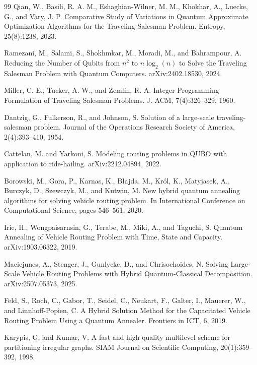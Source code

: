 \begin{thebibliography}{99}
Qian, W., Basili, R. A. M., Eshaghian-Wilner, M. M., Khokhar, A., Luecke, G., and Vary, J. P.
Comparative Study of Variations in Quantum Approximate Optimization Algorithms for the Traveling Salesman Problem.
Entropy, 25(8):1238, 2023.

Ramezani, M., Salami, S., Shokhmkar, M., Moradi, M., and Bahrampour, A.
Reducing the Number of Qubits from $n^2$ to $n\log_{2}(n)$ to Solve the Traveling Salesman Problem with Quantum Computers.
arXiv:2402.18530, 2024.

Miller, C. E., Tucker, A. W., and Zemlin, R. A.
Integer Programming Formulation of Traveling Salesman Problems.
J. ACM, 7(4):326–329, 1960.

Dantzig, G., Fulkerson, R., and Johnson, S.
Solution of a large-scale traveling-salesman problem.
Journal of the Operations Research Society of America, 2(4):393--410, 1954.

Cattelan, M. and Yarkoni, S.
Modeling routing problems in QUBO with application to ride-hailing.
arXiv:2212.04894, 2022.


Borowski, M., Gora, P., Karnas, K., Błajda, M., Król, K., Matyjasek, A., Burczyk, D., Szewczyk, M., and Kutwin, M.
New hybrid quantum annealing algorithms for solving vehicle routing problem.
In International Conference on Computational Science, pages 546--561, 2020.

Irie, H., Wongpaisarnsin, G., Terabe, M., Miki, A., and Taguchi, S.
Quantum Annealing of Vehicle Routing Problem with Time, State and Capacity.
arXiv:1903.06322, 2019.

Maciejunes, A., Stenger, J., Gunlycke, D., and Chrisochoides, N.
Solving Large-Scale Vehicle Routing Problems with Hybrid Quantum-Classical Decomposition.
arXiv:2507.05373, 2025.

Feld, S., Roch, C., Gabor, T., Seidel, C., Neukart, F., Galter, I., Mauerer, W., and Linnhoff-Popien, C.
A Hybrid Solution Method for the Capacitated Vehicle Routing Problem Using a Quantum Annealer.
Frontiers in ICT, 6, 2019.

Karypis, G. and Kumar, V.
A fast and high quality multilevel scheme for partitioning irregular graphs.
SIAM Journal on Scientific Computing, 20(1):359--392, 1998.


\end{thebibliography}
